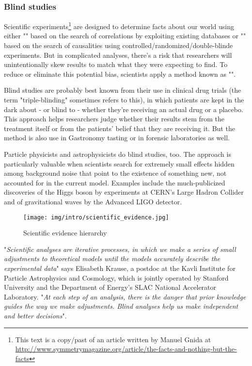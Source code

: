 	\subsubsection{Blind studies}
	Scientific experiments\footnote{This text is a copy/past of an article written by Manuel Gnida at \url{http://www.symmetrymagazine.org/article/the-facts-and-nothing-but-the-facts}} are designed to determine facts about our world using either "" based on the search of correlations by exploiting existing databases or "" based on the search of causalities using controlled/randomized/double-blinde experiments. But in complicated analyses, there's a risk that researchers will unintentionally skew results to match what they were expecting to find. To reduce or eliminate this potential bias, scientists apply a method known as "".
	
	Blind studies are probably best known from their use in clinical drug trials (the term "triple-blinding" sometimes refers to this), in which patients are kept in the dark about - or blind to - whether they're receiving an actual drug or a placebo. This approach helps researchers judge whether their results stem from the treatment itself or from the patients' belief that they are receiving it. But the method is also use in Gastronomy tasting or in forensic laboratories as well.
	
	Particle physicists and astrophysicists do blind studies, too. The approach is particularly valuable when scientists search for extremely small effects hidden among background noise that point to the existence of something new, not accounted for in the current model. Examples include the much-publicized discoveries of the Higgs boson by experiments at CERN's Large Hadron Collider and of gravitational waves by the Advanced LIGO detector.
	\begin{figure}[H]
		\centering
		\texttt{[image: img/intro/scientific\_evidence.jpg]}
		\caption{Scientific evidence hierarchy}
	\end{figure}
	"\textit{Scientific analyses are iterative processes, in which we make a series of small adjustments to theoretical models until the models accurately describe the experimental data}" says Elisabeth Krause, a postdoc at the Kavli Institute for Particle Astrophysics and Cosmology, which is jointly operated by Stanford University and the Department of Energy's SLAC National Accelerator Laboratory. "\textit{At each step of an analysis, there is the danger that prior knowledge guides the way we make adjustments. Blind analyses help us make independent and better decisions}".
	
